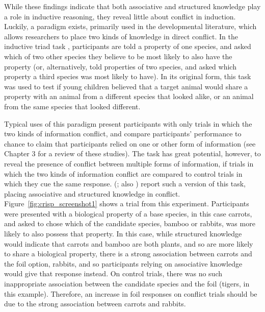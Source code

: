 While these findings indicate that
both associative and structured knowledge play a role in inductive reasoning,
they reveal little about conflict in induction.
Luckily, a paradigm exists, primarily used in the developmental literature,
which allows researchers to place two kinds of knowledge in direct conflict.
In the inductive triad task \citep{Gelman1986},
participants are told a property of one species,
and asked which of two other species
they believe to be most likely to also have the property
(or, alternatively, told properties of two species,
and asked which property a third species was most likely to have).
In its original form,
this task was used to test if young children
believed that a target animal would share a property with
an animal from a different species that looked alike,
or an animal from the same species that looked different.








Typical uses of this paradigm
present participants with only trials in which the two kinds of information conflict,
and compare participants' performance to chance
to claim that participants relied on one or other form of information
(see Chapter 3 for a review of these studies).
The task has great potential, however,
to reveal the presence of conflict between multiple forms of information,
if trials in which the two kinds of information conflict
are compared to control trials in which they cue the same response.
\citeauthor{Bright} (\citeyear{Bright}; also \citealp[Chapter 5]{Crisp-Bright2010}) report
such a version of this task, placing associative and structured knowledge in conflict.
Figure~\ref{fig:crisp_screenshot1} shows a trial from this experiment.
Participants were presented with a biological property of a base species,
in this case carrots,
and asked to chose which of the candidate species,
bamboo or rabbits, was more likely to also possess that property.
In this case, while structured knowledge would indicate
that carrots and bamboo are both plants,
and so are more likely to share a biological property,
there is a strong association between carrots and
the foil option, rabbits,
and so participants relying on associative knowledge
would give that response instead.
On control trials, there was no such inappropriate association
between the candidate species and the foil (tigers, in this example).
Therefore, an increase in foil responses on conflict trials
should be due to the strong association between carrots and rabbits.

